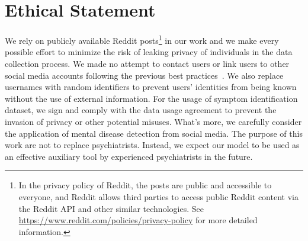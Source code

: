 \section{Ethical Statement}

We rely on publicly available Reddit posts\footnote{In the privacy policy of Reddit, the posts are public and accessible to everyone, and Reddit allows third parties to access public Reddit content via the Reddit API and other similar technologies. See \url{https://www.reddit.com/policies/privacy-policy} for more detailed information.} in our work and we make every possible effort to minimize the risk of leaking privacy of individuals in the data collection process. We made no attempt to contact users or link users to other social media accounts following the previous best practices~\cite{cohan2018smhd,losada2017erisk,Suhavi2022TwitterSTMHDAE}. We also replace usernames with random identifiers to prevent users’ identities from being known without the use of external information. 
For the usage of symptom identification dataset, we sign and comply with the data usage agreement to prevent the invasion of privacy or other potential misuses.
What's more,  we carefully consider the application of mental disease detection from social media. The purpose of this work are not to replace psychiatrists. Instead, we expect our model to be used as an effective auxiliary tool by experienced psychiatrists in the future.
